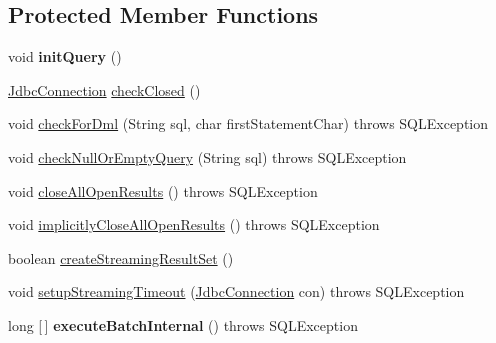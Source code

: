 \subsection*{Protected Member Functions}
\begin{DoxyCompactItemize}
\item 
\mbox{\label{classcom_1_1mysql_1_1cj_1_1jdbc_1_1_statement_impl_a754a5bf5b0c4a83c123c657e6834d16c}} 
void {\bfseries init\+Query} ()
\item 
\mbox{\hyperlink{interfacecom_1_1mysql_1_1cj_1_1jdbc_1_1_jdbc_connection}{Jdbc\+Connection}} \mbox{\hyperlink{classcom_1_1mysql_1_1cj_1_1jdbc_1_1_statement_impl_abd738a18f0109b2305a642025eb4a3bb}{check\+Closed}} ()
\item 
void \mbox{\hyperlink{classcom_1_1mysql_1_1cj_1_1jdbc_1_1_statement_impl_a153a70521a7a239c1d6ad089f474d7ba}{check\+For\+Dml}} (String sql, char first\+Statement\+Char)  throws S\+Q\+L\+Exception 
\item 
void \mbox{\hyperlink{classcom_1_1mysql_1_1cj_1_1jdbc_1_1_statement_impl_ae8ad6b113e7dffaf4f20129eba328f7b}{check\+Null\+Or\+Empty\+Query}} (String sql)  throws S\+Q\+L\+Exception 
\item 
void \mbox{\hyperlink{classcom_1_1mysql_1_1cj_1_1jdbc_1_1_statement_impl_a471a61331072cf89533c58507ad21719}{close\+All\+Open\+Results}} ()  throws S\+Q\+L\+Exception 
\item 
void \mbox{\hyperlink{classcom_1_1mysql_1_1cj_1_1jdbc_1_1_statement_impl_a424894ae04079fd072300d7a54de6243}{implicitly\+Close\+All\+Open\+Results}} ()  throws S\+Q\+L\+Exception 
\item 
boolean \mbox{\hyperlink{classcom_1_1mysql_1_1cj_1_1jdbc_1_1_statement_impl_a4a514bb3e111c30e6b376b74bb8f78e8}{create\+Streaming\+Result\+Set}} ()
\item 
void \mbox{\hyperlink{classcom_1_1mysql_1_1cj_1_1jdbc_1_1_statement_impl_a04f28c7dc2d7b2c20ae6fad4301dd8fc}{setup\+Streaming\+Timeout}} (\mbox{\hyperlink{interfacecom_1_1mysql_1_1cj_1_1jdbc_1_1_jdbc_connection}{Jdbc\+Connection}} con)  throws S\+Q\+L\+Exception 
\item 
\mbox{\label{classcom_1_1mysql_1_1cj_1_1jdbc_1_1_statement_impl_abd879bf637f7f3ba5e74050912735836}} 
long \mbox{[}$\,$\mbox{]} {\bfseries execute\+Batch\+Internal} ()  throws S\+Q\+L\+Exception 
\item 

\end{DoxyCompactItemize}
